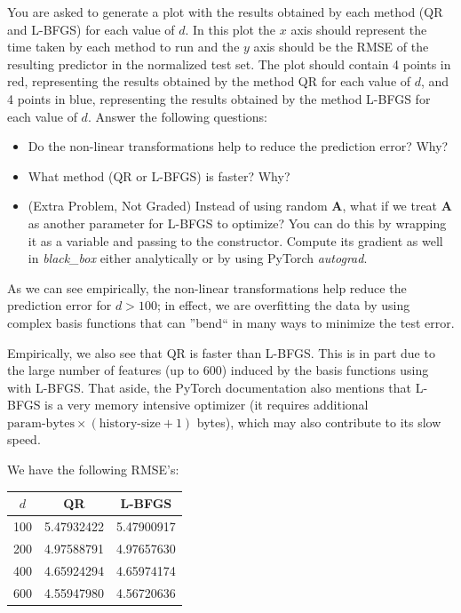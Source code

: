 \documentclass[submit]{harvardml}
\begin{document}
\begin{problem}[14pts]
You are asked to generate a plot
with the results obtained by each method (QR and L-BFGS)
for each value of $d$. In this plot
the $x$ axis should represent the time taken by each method to
run and the $y$ axis should be the RMSE of the resulting predictor in the
normalized test set. The plot should
contain 4 points in red, representing the results obtained by the method QR for
each value of $d$, and 4 points in blue, representing the results obtained
by the method L-BFGS for each value of $d$. Answer the following questions:
\begin{itemize}
\item Do the non-linear transformations help to reduce the prediction error? Why?
\item What method (QR or L-BFGS) is faster? Why?
\item (Extra Problem, Not Graded) Instead of using random $\mathbf{A}$, what if we treat
  $\mathbf{A}$ as another parameter for L-BFGS to optimize? You can do
  this by wrapping it as a variable and passing to the
  constructor. Compute its gradient as well in \textit{black\_box}
  either analytically or by using PyTorch \textit{autograd}.


\end{itemize}
\vspace{0.1cm}
\end{problem}

\newpage
As we can see empirically, the non-linear transformations help reduce the prediction error for $d > 100$; in effect, we are overfitting the data by using complex basis functions that can ''bend`` in many ways to minimize the test error.

Empirically, we also see that QR is faster than L-BFGS. This is in part due to the large number of features (up to 600) induced by the basis functions using with L-BFGS. That aside, the PyTorch documentation also mentions that L-BFGS is a very memory intensive optimizer (it requires additional $\text{param-bytes} \times (\text{history-size} + 1)$ bytes), which may also contribute to its slow speed.

We have the following RMSE's:

\centering
\begin{tabular}{c|c|c}
	$d$ & QR & L-BFGS \\ \hline
	100 & 5.47932422 & 5.47900917 \\
	200 & 4.97588791 & 4.97657630 \\
	400 & 4.65924294 & 4.65974174 \\
	600 & 4.55947980 & 4.56720636
\end{tabular}
\end{document}
